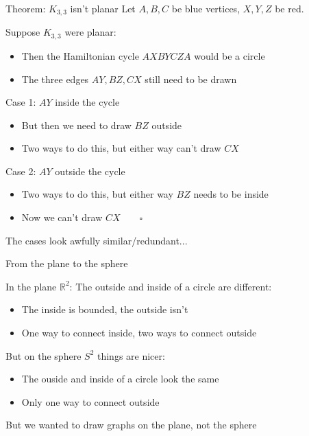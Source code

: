 \documentclass{beamer}
\begin{document}
\begin{frame}{Theorem: $K_{3,3}$ isn't planar}
Let $A,B,C$ be blue vertices, $X,Y,Z$ be red.
  \begin{block}{Suppose $K_{3,3}$ were planar:}
    \begin{itemize}
    \item  Then the Hamiltonian cycle $AXBYCZA$ would be a circle
      \item The three edges $AY, BZ, CX$ still need to be drawn
\end{itemize}
    \end{block}
  \begin{block}{Case 1: $AY$ inside the cycle}
    \begin{itemize}
    \item But then we need to draw $BZ$ outside
    \item Two ways to do this, but either way can't draw $CX$
      \end{itemize}
  \end{block}
  \begin{block}{Case 2: $AY$ outside the cycle}
    \begin{itemize}
    \item Two ways to do this, but either way $BZ$ needs to be inside
    \item Now we can't draw $CX\quad\quad\square$
      \end{itemize}
\end{block}
  \begin{block}{The cases look awfully similar/redundant...}
    \end{block}

\end{frame}

\begin{frame}{From the plane to the sphere}
  \begin{block}{In the plane $\mathbb{R}^2$:}
    The outside and inside of a circle are different:
\begin{itemize}
\item    The inside is bounded, the outside isn't
  \item One way to connect inside, two ways to connect outside
\end{itemize}
\end{block}
  
  \begin{block}{But on the sphere $S^2$ things are nicer:}
    \begin{itemize}
    \item The ouside and inside of a circle look the same
    \item Only one way to connect outside      
    \end{itemize}
\end{block}
    \begin{block}{But we wanted to draw graphs on the plane, not the sphere}

      \end{block}
    \end{frame}
\end{document}
